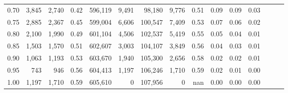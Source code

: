 \begin{tabular}{rrrrrrrrrrrrrrr}
0.70 &    3,845 &   2,740 &  0.42 &  596,119 &    9,491 &   98,180 &    9,776 &  0.51 &  0.09 &  0.09 &      0.03 \\
0.75 &    2,885 &   2,367 &  0.45 &  599,004 &    6,606 &  100,547 &    7,409 &  0.53 &  0.07 &  0.06 &      0.02 \\
0.80 &    2,100 &   1,990 &  0.49 &  601,104 &    4,506 &  102,537 &    5,419 &  0.55 &  0.05 &  0.04 &      0.01 \\
0.85 &    1,503 &   1,570 &  0.51 &  602,607 &    3,003 &  104,107 &    3,849 &  0.56 &  0.04 &  0.03 &      0.01 \\
0.90 &    1,063 &   1,193 &  0.53 &  603,670 &    1,940 &  105,300 &    2,656 &  0.58 &  0.02 &  0.02 &      0.01 \\
0.95 &      743 &     946 &  0.56 &  604,413 &    1,197 &  106,246 &    1,710 &  0.59 &  0.02 &  0.01 &      0.00 \\
1.00 &    1,197 &   1,710 &  0.59 &  605,610 &        0 &  107,956 &        0 &   nan &  0.00 &  0.00 &      0.00 \\
\bottomrule
\end{tabular}
